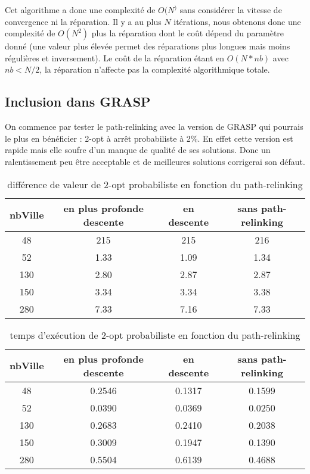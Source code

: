 \documentclass[12pt,a4paper]{article}
\begin{document}
Cet algorithme a donc une complexité de $O(N^)$ sans considérer la vitesse de convergence ni la réparation. Il y a au plus $N$ itérations, nous obtenons donc une complexité de $O(N^2)$ plus la réparation dont le coût dépend du paramètre donné (une valeur plus élevée permet des réparations plus longues mais moins régulières et inversement). Le coût de la réparation étant en $O(N*nb)$ avec $nb<N/2$, la réparation n'affecte pas la complexité algorithmique totale.\\

\subsection{Inclusion dans GRASP}

On commence par tester le path-relinking avec la version de GRASP qui pourrais le plus en bénéficier : 2-opt à arrêt probabiliste à 2\%. En effet cette version est rapide mais elle soufre d'un manque de qualité de ses solutions. Donc un ralentissement peu être acceptable et de meilleures solutions corrigerai son défaut.

\begin{table}[!h]
\centering
\begin{tabular}{|*{4}{c|}}
\hline
nbVille & en plus profonde descente & en descente & sans path-relinking \\
\hline
48 & 215 & 215 & 216 \\
52 & 1.33 & 1.09 & 1.34 \\
130 & 2.80 & 2.87 & 2.87 \\
150 & 3.34 & 3.34 & 3.38 \\
280 & 7.33 & 7.16 & 7.33 \\
\hline
\end{tabular}
\caption{différence de valeur de 2-opt probabiliste en fonction du path-relinking}
\label{val2optgraspPR}
\end{table}

\begin{table}[!h]
\centering
\begin{tabular}{|*{4}{c|}}
\hline
nbVille & en plus profonde descente & en descente & sans path-relinking \\
\hline
48 & 0.2546 & 0.1317 & 0.1599 \\
52 & 0.0390 & 0.0369 & 0.0250 \\
130 & 0.2683 & 0.2410 & 0.2038 \\
150 & 0.3009 & 0.1947 & 0.1390 \\
280 & 0.5504 & 0.6139 & 0.4688 \\
\hline
\end{tabular}
\caption{temps d’exécution de 2-opt probabiliste en fonction du path-relinking}
\label{temps2optgraspPR}
\end{table}
\end{document}
